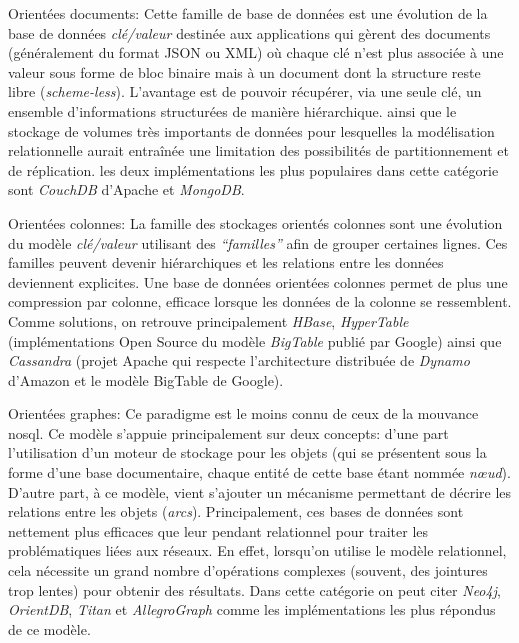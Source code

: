   \textsf{Orientées documents}: Cette famille de base de données est
  une évolution de la base de données \textit{clé/valeur} destinée aux
  applications qui gèrent des documents (généralement du format
  \textsc{JSON} ou \textsc{XML}) où chaque clé n'est plus associée à
  une valeur sous forme de bloc binaire mais à un document dont la
  structure reste libre (\textit{scheme-less}). L'avantage est de
  pouvoir récupérer, via une seule clé, un ensemble d’informations
  structurées de manière hiérarchique. ainsi que le stockage de
  volumes très importants de données pour lesquelles la modélisation
  relationnelle aurait entraînée une limitation des possibilités de
  partitionnement et de réplication. les deux implémentations les plus
  populaires dans cette catégorie sont \emph{CouchDB} d'Apache et
  \emph{MongoDB}.\bigskip

  \textsf{Orientées colonnes}: La famille des stockages orientés
  colonnes sont une évolution du modèle \textit{clé/valeur} utilisant
  des \textit{``familles''} afin de grouper certaines lignes. Ces
  familles peuvent devenir hiérarchiques et les relations entre les
  données deviennent explicites. Une base de données orientées
  colonnes permet de plus une compression par colonne, efficace
  lorsque les données de la colonne se ressemblent. Comme solutions,
  on retrouve principalement \emph{HBase}, \emph{HyperTable}
  (implémentations Open Source du modèle \emph{BigTable}
  \cite{chang2008bigtable} publié par Google) ainsi que
  \emph{Cassandra} (projet Apache qui respecte l'architecture
  distribuée de \emph{Dynamo} \cite{decandia2007dynamo} d'Amazon et le
  modèle BigTable de Google).\bigskip

  \textsf{Orientées graphes}: Ce paradigme est le moins connu de ceux
  de la mouvance \acrshort{nosql}. Ce modèle s'appuie principalement
  sur deux concepts: d'une part l'utilisation d'un moteur de stockage
  pour les objets (qui se présentent sous la forme d'une base
  documentaire, chaque entité de cette base étant nommée
  \emph{nœud}). D'autre part, à ce modèle, vient s'ajouter un
  mécanisme permettant de décrire les relations entre les objets
  (\emph{arcs}). Principalement, ces bases de données sont nettement
  plus efficaces que leur pendant relationnel pour traiter les
  problématiques liées aux réseaux.  En effet, lorsqu'on utilise le
  modèle relationnel, cela nécessite un grand nombre d'opérations
  complexes (souvent, des jointures trop lentes) pour obtenir des
  résultats. Dans cette catégorie on peut citer \emph{Neo4j},
  \emph{OrientDB}, \emph{Titan} et \emph{AllegroGraph} comme les
  implémentations les plus répondus de ce modèle.

